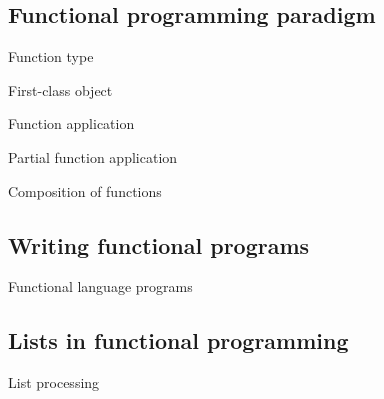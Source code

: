 \subsection{Functional programming paradigm}

  \noindent
  Function type

  \noindent
  First-class object

  \noindent
  Function application

  \noindent
  Partial function application

  \noindent
  Composition of functions

\subsection{Writing functional programs}

  \noindent
  Functional language programs

\subsection{Lists in functional programming}

  \noindent
  List processing